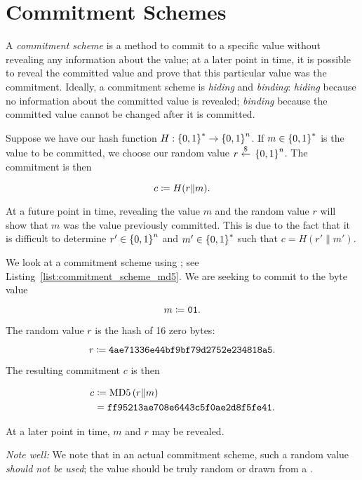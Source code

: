 \section{Commitment Schemes}

A \emph{commitment scheme} is a method to commit to a specific value
without revealing any information about the value;
at a later point in time, it is possible to reveal the committed
value and prove that this particular value was the commitment.
Ideally, a commitment scheme is \emph{hiding} and \emph{binding}:
\emph{hiding} because no information about the committed value is revealed;
\emph{binding} because the committed value cannot be changed after
it is committed.

Suppose we have our \gls{hash function} $H:\left\{ 0,1 \right\}^{*}\to\left\{ 0,1 \right\}^{n}$.
If $m\in\left\{ 0,1 \right\}^{*}$ is the value to be committed,
we choose our random value $r\stackrel{\$}{\leftarrow}{}\left\{ 0,1 \right\}^{n}$.
The commitment is then

\begin{equation}
    c \coloneqq{} H(r\|m).
\end{equation}

\noindent
At a future point in time, revealing the value $m$ and the random value $r$
will show that $m$ was the value previously committed.
This is due to the fact that it is difficult to determine
$r'\in\left\{ 0,1 \right\}^{n}$ and $m'\in\left\{ 0,1 \right\}^{*}$
such that $c = H(r'\|m')$.

\begin{example}

We look at a commitment scheme using \MDFive{};
see Listing~\ref{list:commitment_scheme_md5}.
We are seeking to commit to the byte value

\begin{equation}
    m \coloneqq{} \texttt{01}.
\end{equation}

\noindent
The random value $r$ is the \MDFive{} hash of 16 zero bytes:

\begin{equation}
    r \coloneqq{} \texttt{4ae71336e44bf9bf79d2752e234818a5}.
\end{equation}

\noindent
The resulting commitment $c$ is then

\begin{align}
    c &\coloneqq{} \text{MD5{}}\left( r\|m \right) \nonumber\\
        &= \texttt{ff95213ae708e6443c5f0ae2d8f5fe41}.
\end{align}

\noindent
At a later point in time, $m$ and $r$ may be revealed.



\emph{Note well:} We note that in an actual commitment scheme,
such a random value \emph{should not be used};
the value should be truly random or drawn from a .
\end{example}

